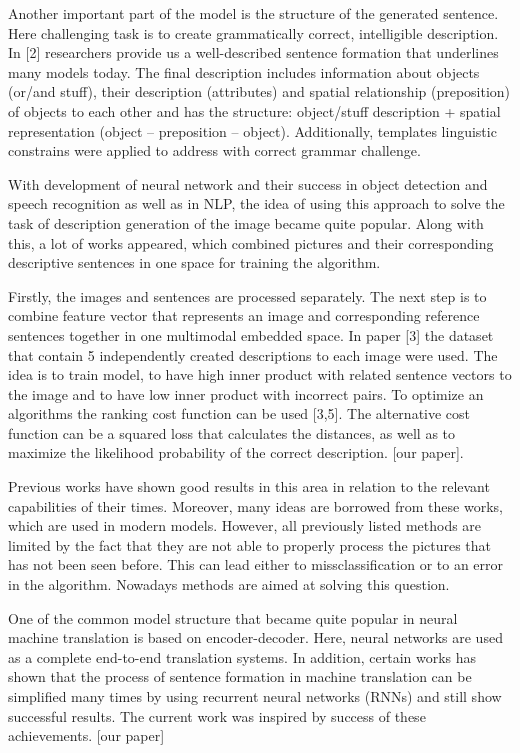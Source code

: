 \documentclass[a4paper,UKenglish,cleveref, autoref, thm-restate]{lipics-v2021}
\begin{document}
Another important part of the model is the structure of the generated sentence. Here challenging task is to create grammatically correct, intelligible description. In [2] researchers provide us a well-described sentence formation that underlines many models today. The final description includes information about objects (or/and stuff), their description (attributes) and spatial relationship (preposition) of objects to each other and has the structure: object/stuff description + spatial representation (object – preposition – object). Additionally, templates linguistic constrains were applied to address with correct grammar challenge.

With development of neural network and their success in object detection and speech recognition as well as in NLP, the idea of using this approach to solve the task of description generation of the image became quite popular. Along with this, a lot of works appeared, which combined pictures and their corresponding descriptive sentences in one space for training the algorithm.

Firstly, the images and sentences are processed separately. The next step is to combine feature vector that represents an image and corresponding reference sentences together in one multimodal embedded space. In paper [3] the dataset that contain 5 independently created descriptions to each image were used. The idea is to train model, to have high inner product with related sentence vectors to the image and to have low inner product with incorrect pairs. To optimize an algorithms the ranking cost function can be used [3,5]. The alternative cost function can be a squared loss that calculates the distances, as well as to maximize the likelihood probability of the correct description. [our paper].

Previous works have shown good results in this area in relation to the relevant capabilities of their times. Moreover, many ideas are borrowed from these works, which are used in modern models. However, all previously listed methods are limited by the fact that they are not able to properly process the pictures that has not been seen before. This can lead either to missclassification or to an error in the algorithm. Nowadays methods are aimed at solving this question.

One of the common model structure that became quite popular in neural machine translation is based on encoder-decoder. Here, neural networks are used as a complete end-to-end translation systems. In addition, certain works has shown that the process of sentence formation in machine translation can be simplified many times by using recurrent neural networks (RNNs) and still show successful results. The current work was inspired by success of these achievements. [our paper]
\end{document}

